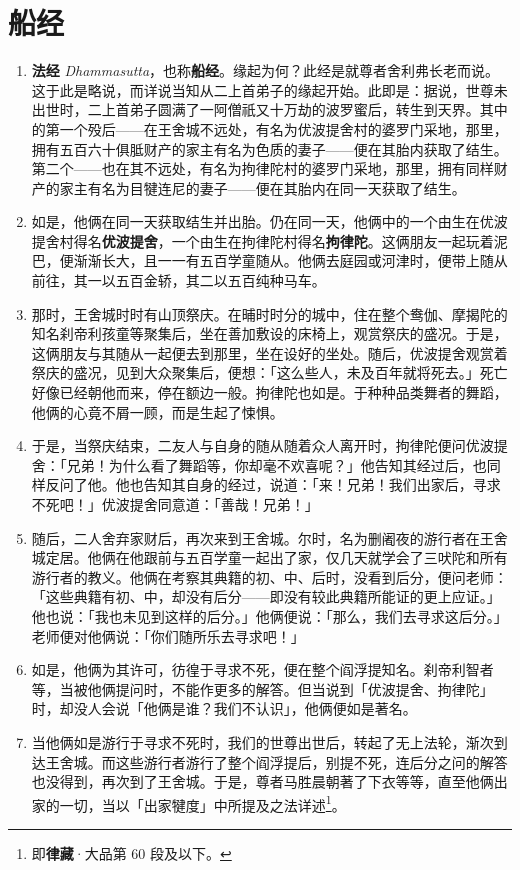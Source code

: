 \section{船经}

\begin{enumerate}\item \textbf{法经} \textit{Dhammasutta}，也称\textbf{船经}。缘起为何？此经是就尊者舍利弗长老而说。这于此是略说，而详说当知从二上首弟子的缘起开始。此即是：据说，世尊未出世时，二上首弟子圆满了一阿僧祇又十万劫的波罗蜜后，转生到天界。其中的第一个殁后——在王舍城不远处，有名为优波提舍村的婆罗门采地，那里，拥有五百六十俱胝财产的家主有名为色质的妻子——便在其胎内获取了结生。第二个——也在其不远处，有名为拘律陀村的婆罗门采地，那里，拥有同样财产的家主有名为目犍连尼的妻子——便在其胎内在同一天获取了结生。
\item 如是，他俩在同一天获取结生并出胎。仍在同一天，他俩中的一个由生在优波提舍村得名\textbf{优波提舍}，一个由生在拘律陀村得名\textbf{拘律陀}。这俩朋友一起玩着泥巴，便渐渐长大，且一一有五百学童随从。他俩去庭园或河津时，便带上随从前往，其一以五百金轿，其二以五百纯种马车。
\item 那时，王舍城时时有山顶祭庆。在晡时时分的城中，住在整个鸯伽、摩揭陀的知名刹帝利孩童等聚集后，坐在善加敷设的床椅上，观赏祭庆的盛况。于是，这俩朋友与其随从一起便去到那里，坐在设好的坐处。随后，优波提舍观赏着祭庆的盛况，见到大众聚集后，便想：「这么些人，未及百年就将死去。」死亡好像已经朝他而来，停在额边一般。拘律陀也如是。于种种品类舞者的舞蹈，他俩的心竟不屑一顾，而是生起了悚惧。
\item 于是，当祭庆结束，二友人与自身的随从随着众人离开时，拘律陀便问优波提舍：「兄弟！为什么看了舞蹈等，你却毫不欢喜呢？」他告知其经过后，也同样反问了他。他也告知其自身的经过，说道：「来！兄弟！我们出家后，寻求不死吧！」优波提舍同意道：「善哉！兄弟！」
\item 随后，二人舍弃家财后，再次来到王舍城。尔时，名为删阇夜的游行者在王舍城定居。他俩在他跟前与五百学童一起出了家，仅几天就学会了三吠陀和所有游行者的教义。他俩在考察其典籍的初、中、后时，没看到后分，便问老师：「这些典籍有初、中，却没有后分——即没有较此典籍所能证的更上应证。」他也说：「我也未见到这样的后分。」他俩便说：「那么，我们去寻求这后分。」老师便对他俩说：「你们随所乐去寻求吧！」
\item 如是，他俩为其许可，彷徨于寻求不死，便在整个阎浮提知名。刹帝利智者等，当被他俩提问时，不能作更多的解答。但当说到「优波提舍、拘律陀」时，却没人会说「他俩是谁？我们不认识」，他俩便如是著名。
\item 当他俩如是游行于寻求不死时，我们的世尊出世后，转起了无上法轮，渐次到达王舍城。而这些游行者游行了整个阎浮提后，别提不死，连后分之问的解答也没得到，再次到了王舍城。于是，尊者马胜晨朝著了下衣等等，直至他俩出家的一切，当以「出家犍度」中所提及之法详述\footnote{即\textbf{律藏}·大品第 60 段及以下。}。

\end{enumerate}
